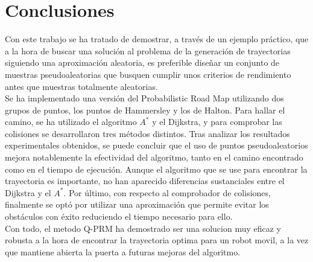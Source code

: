 \chapter{Conclusiones}
\label{Conclusiones}

Con este trabajo se ha tratado de demostrar, a través de un ejemplo práctico, que a la hora de buscar una solución al problema de la generación de trayectorias siguiendo una aproximación aleatoria, es preferible diseñar un conjunto de muestras pseudoaleatorias que busquen cumplir unos criterios de rendimiento antes que muestras totalmente aleatorias.\\

Se ha implementado una versión del Probabilistic Road Map utilizando dos grupos de puntos, los puntos de Hammersley y los de Halton. Para hallar el camino, se ha utilizado el algoritmo $A^*$ y el Dijkstra, y para comprobar las colisiones se desarrollaron tres métodos distintos. Tras analizar los resultados experimentales obtenidos, se puede concluir que el uso de puntos pseudoaleatorios mejora notablemente la efectividad del algoritmo, tanto en el camino encontrado como en el tiempo de ejecución. Aunque el algoritmo que se use para encontrar la trayectoria es importante, no han aparecido diferencias sustanciales entre el Dijkstra y el $A^*$. Por último, con respecto al comprobador de colisiones, finalmente se optó por utilizar una aproximación que permite evitar los obstáculos con éxito reduciendo el tiempo necesario para ello.\\

Con todo, el metodo Q-PRM ha demostrado ser una solucion muy eficaz y robusta a la hora de encontrar la trayectoria optima para un robot movil, a la vez que mantiene abierta la puerta a futuras mejoras del algoritmo.   